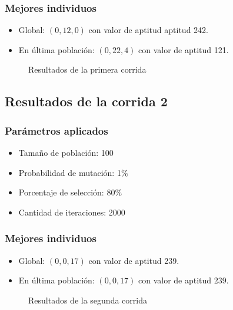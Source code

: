 \documentclass{conaiisi}
\begin{document}
\subsubsection*{Mejores individuos}
\begin{itemize}
	\item Global: $(0, 12, 0)$ con valor de aptitud aptitud 242.
	\item En última población: $(0, 22, 4)$ con valor de aptitud 121.
\end{itemize}

\begin{figure}[h!]
\centering
{}
\caption{Resultados de la primera corrida}
\end{figure}

\newpage

\subsection*{Resultados de la corrida 2}
\subsubsection*{Parámetros aplicados}

\begin{multicols}{2}
\begin{itemize}
	\item Tamaño de población: 100
	\item Probabilidad de mutación: 1\%
	\item Porcentaje de selección: 80\%
	\item Cantidad de iteraciones: 2000
\end{itemize}
\end{multicols}

\subsubsection*{Mejores individuos}
\begin{itemize}
	\item Global: $(0, 0, 17)$ con valor de aptitud 239.
	\item En última población: $(0, 0, 17)$ con valor de aptitud 239.
\end{itemize}

\begin{figure}[h!]
\centering
{}
\caption{Resultados de la segunda corrida}
\end{figure}
\end{document}
